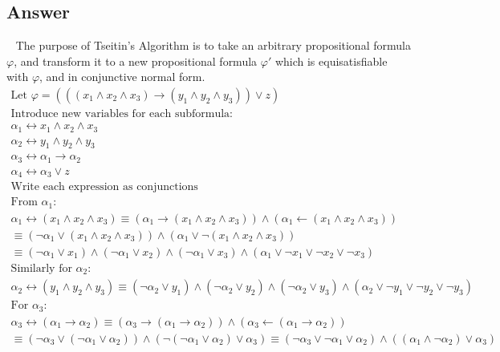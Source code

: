 \documentclass[12pt]{fphw}
\begin{document}
\subsection*{Answer} \ \newline
The purpose of Tseitin's Algorithm is to take an arbitrary propositional formula $\varphi$, and transform it to a new propositional formula $\varphi'$ which is equisatisfiable with $\varphi$, and in conjunctive normal form.
\begin{gather*}
  \text{Let } \varphi = (((x_1 \wedge x_2 \wedge x_3) \to (y_1 \wedge y_2 \wedge y_3)) \vee z) \\
  \text{Introduce new variables for each subformula:} \\
  \alpha_1 \leftrightarrow x_1 \wedge x_2 \wedge x_3 \\
  \alpha_2 \leftrightarrow y_1 \wedge y_2 \wedge y_3 \\
  \alpha_3 \leftrightarrow \alpha_1 \to \alpha_2 \\
  \alpha_4 \leftrightarrow \alpha_3 \vee z \\
  \text{Write each expression as conjunctions} \\
  \text{From } \alpha_1: \\
  \alpha_1 \leftrightarrow (x_1 \wedge x_2 \wedge x_3) \equiv (\alpha_1 \to (x_1 \wedge x_2 \wedge x_3)) \wedge (\alpha_1 \leftarrow (x_1 \wedge x_2 \wedge x_3)) \\
  \equiv (\neg \alpha_1 \vee (x_1 \wedge x_2 \wedge x_3)) \wedge (\alpha_1 \vee \neg(x_1 \wedge x_2 \wedge x_3)) \\
  \equiv (\neg \alpha_1 \vee x_1) \wedge (\neg \alpha_1 \vee x_2) \wedge (\neg \alpha_1 \vee x_3) \wedge (\alpha_1 \vee \neg x_1 \vee \neg x_2 \vee \neg x_3) \\
  \text{Similarly for } \alpha_2: \\
  \alpha_2 \leftrightarrow (y_1 \wedge y_2 \wedge y_3) \equiv (\neg \alpha_2 \vee y_1) \wedge (\neg \alpha_2 \vee y_2) \wedge (\neg \alpha_2 \vee y_3) \wedge (\alpha_2 \vee \neg y_1 \vee \neg y_2 \vee \neg y_3) \\
  \text{For } \alpha_3: \\ 
  \alpha_3 \leftrightarrow (\alpha_1 \to \alpha_2) \equiv (\alpha_3 \to (\alpha_1 \to \alpha_2)) \wedge (\alpha_3 \leftarrow (\alpha_1 \to \alpha_2))\\ 
  \equiv (\neg \alpha_3 \vee (\neg \alpha_1 \vee \alpha_2)) \wedge (\neg(\neg \alpha_1 \vee \alpha_2) \vee \alpha_3)  \equiv (\neg \alpha_3 \vee \neg \alpha_1 \vee \alpha_2) \wedge ((\alpha_1 \wedge \neg \alpha_2) \vee \alpha_3) \\

\end{gather*}
\end{document}

